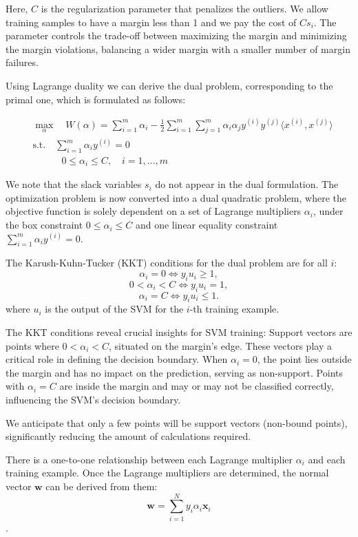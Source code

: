 \documentclass[10pt,a4paper]{article}
\newcounter{para}
\begin{document}
Here, \( C \) is the regularization parameter that penalizes the outliers. We allow training samples to have a margin less than 1 and we pay the cost of \( C s_i\). The parameter controls the trade-off between maximizing the margin and minimizing the margin violations, balancing a wider margin with a smaller number of margin failures.

Using Lagrange duality we can derive the dual problem, corresponding to the primal one, which is formulated as follows:

\[
\begin{aligned}
	& \max_{\alpha} \quad W(\alpha) = \sum_{i=1}^{m} \alpha_i - \frac{1}{2} \sum_{i=1}^{m} \sum_{j=1}^{m} \alpha_i \alpha_j y^{(i)} y^{(j)} \langle x^{(i)}, x^{(j)} \rangle \\
	& \text{s.t.} \quad \sum_{i=1}^{m} \alpha_i y^{(i)} = 0 \\
	& \quad \quad \quad 0 \leq \alpha_i \leq C, \quad i = 1, \ldots, m
\end{aligned}
\]

We note that the slack variables \(s_i\) do not appear in the dual formulation.
The optimization problem is now converted into a dual quadratic problem, where the objective function is solely dependent on a set of Lagrange multipliers \(\alpha_i\), under the box constraint \(0 \leq \alpha_i \leq C\) and one linear equality constraint \(\sum_{i=1}^{m} \alpha_i y^{(i)} = 0\). 


The Karush-Kuhn-Tucker (KKT) conditions for the dual problem are for all \( i \):
\[ 
\alpha_i = 0 \iff y_i u_i \geq 1,
\]
\[ 
0 < \alpha_i < C \iff y_i u_i = 1,
\]
\[ 
\alpha_i = C \iff y_i u_i \leq 1.
\]
where \( u_i \) is the output of the SVM for the \( i \)-th training example.

The KKT conditions reveal crucial insights for SVM training:
Support vectors are points where \( 0 < \alpha_i < C \), situated on the margin's edge. These vectors play a critical role in defining the decision boundary.
When \( \alpha_i = 0 \), the point lies outside the margin and has no impact on the prediction, serving as non-support.
Points with \( \alpha_i = C \) are inside the margin and may or may not be classified correctly, influencing the SVM's decision boundary.

We anticipate that only a few points will be support vectors (non-bound points), significantly reducing the amount of calculations required.

There is a one-to-one relationship between each Lagrange multiplier \( \alpha_i \) and each training example. Once the Lagrange multipliers are determined, the normal vector \( \mathbf{w} \) can be derived from them:
\[ 
\mathbf{w} = \sum_{i=1}^{N} y_i \alpha_i \mathbf{x}_i 
\].
\end{document}
